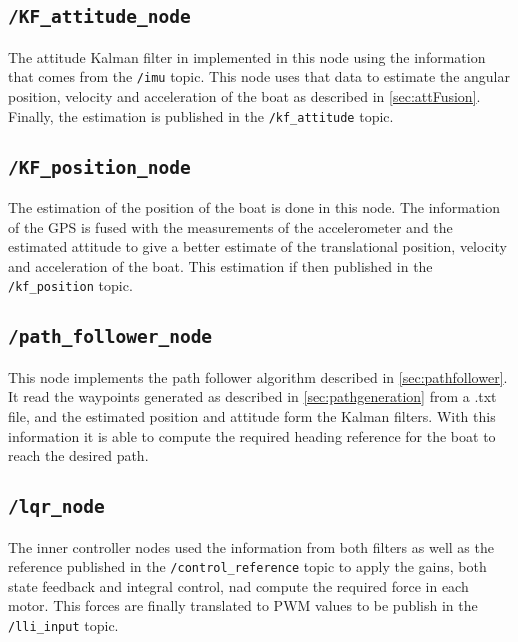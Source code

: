 \subsection*{\lstinline[style=cinline]{/KF_attitude_node}}
The attitude Kalman filter in implemented in this node using the information that comes from the \lstinline[style=cinline]{/imu} topic. This node uses that data to estimate the angular position, velocity and acceleration of the boat as described in \autoref{sec:attFusion}. Finally, the estimation is published in the \lstinline[style=cinline]{/kf_attitude} topic.

\subsection*{\lstinline[style=cinline]{/KF_position_node}}
The estimation of the position of the boat is done in this node. The information of the GPS is fused with the measurements of the accelerometer and the estimated attitude to give a better estimate of the translational position, velocity and acceleration of the boat. This estimation if then  published in the \lstinline[style=cinline]{/kf_position} topic.

\subsection*{\lstinline[style=cinline]{/path_follower_node}}
This node implements the path follower algorithm described in \autoref{sec:pathfollower}. It read the waypoints generated as described in \autoref{sec:pathgeneration} from a .txt file, and the estimated position and attitude form the Kalman filters. With this information it is able to compute the required heading reference for the boat to reach the desired path.

\subsection*{\lstinline[style=cinline]{/lqr_node}}
The inner controller nodes used the information from both filters as well as the reference published in the \lstinline[style=cinline]{/control_reference} topic to apply the gains, both state feedback and integral control, nad compute the required force in each motor. This forces are finally translated to PWM values to be publish in the \lstinline[style=cinline]{/lli_input} topic.

